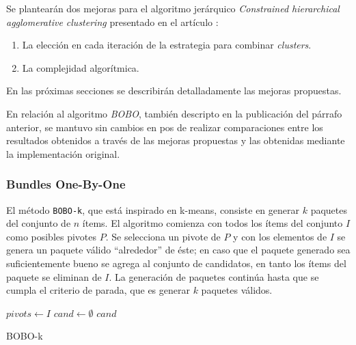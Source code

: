 Se plantearán dos mejoras para el algoritmo jerárquico \textit{Constrained hierarchical agglomerative clustering} presentado en el artículo \cite{journals/tkde/Amer-YahiaBCFMZ14}: 
\begin{enumerate}
	\item La elección en cada iteración de la estrategia para combinar \textit{clusters}.
	\item La complejidad algorítmica.
\end{enumerate}

En las próximas secciones se describirán detalladamente las mejoras propuestas.

En relación al algoritmo \textit{BOBO}, también descripto en la publicación del párrafo anterior, se mantuvo sin cambios en pos de realizar comparaciones entre los resultados obtenidos a través de las mejoras propuestas y las obtenidas mediante la implementación original.

\subsubsection{Bundles One-By-One}
El método \texttt{BOBO-k}, que está inspirado en k-means, consiste en generar $k$ paquetes del conjunto de $n$ ítems. El algoritmo comienza con todos los ítems del conjunto $I$ como posibles pivotes $P$. Se selecciona un pivote de $P$ y con los elementos de $I$ se genera un paquete válido ``alrededor'' de éste; en caso que el paquete generado sea suficientemente bueno se agrega al conjunto de candidatos, en tanto los ítems del paquete se eliminan de $I$. La generación de paquetes continúa hasta que se cumpla el criterio de parada, que es generar $k$ paquetes válidos.

\begin{center}
	\begin{algorithm}[H]
	\DontPrintSemicolon
	\SetAlgoLined
		$pivots \leftarrow I$\;
		$cand \leftarrow \emptyset$\;
		\Return $cand$\;
	\caption{BOBO-k}\label{alg:bobo}
	\end{algorithm}
\end{center}

